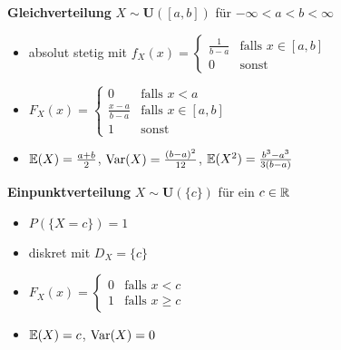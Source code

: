 \textbf{Gleichverteilung} $X\sim\mathbf{U}([a,b])$ für $-\infty < a < b < \infty$
\begin{itemize}
\item absolut stetig mit
  $f_X(x) = \begin{cases}
  \frac{1}{b-a} 	& \text{falls } x \in [a,b]	\\
  0				& \text{sonst }
  \end{cases}$

\item
  $F_X(x) = \begin{cases}
  0               & \text{falls } x < a	    	\\
  \frac{x-a}{b-a} & \text{falls } x \in [a,b]	\\
  1               & \text{sonst}
  \end{cases}$

\item $\mathbb{E}(X) = \frac{a+b}{2}$, $\operatorname{Var}(X) = \frac{(b-a)^2}{12}$,
  $\mathbb{E}(X^2) = \frac{b^3-a^3}{3(b-a)}$
\end{itemize}

\textbf{Einpunktverteilung} $X\sim\mathbf{U}(\{c\})$ für ein $c\in\mathbb{R}$
\begin{itemize}
\item $P(\{X=c\}) = 1$

\item diskret mit $D_X = \{c\}$

\item
  $F_X(x) = \begin{cases}
  0 	&\text{falls } x < c     \\
  1 & \text{falls } x \geq c
  \end{cases}$

\item $\mathbb{E}(X) = c$, $\operatorname{Var}(X) = 0$
\end{itemize}

